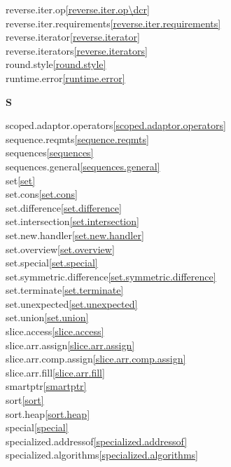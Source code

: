 \begin{multicols}{2}
reverse.iter.op\dcr\quad\ref{reverse.iter.op\dcr}\\
reverse.iter.requirements\quad\ref{reverse.iter.requirements}\\
reverse.iterator\quad\ref{reverse.iterator}\\
reverse.iterators\quad\ref{reverse.iterators}\\
round.style\quad\ref{round.style}\\
runtime.error\quad\ref{runtime.error}\\
\par \textbf{S}\par
scoped.adaptor.operators\quad\ref{scoped.adaptor.operators}\\
sequence.reqmts\quad\ref{sequence.reqmts}\\
sequences\quad\ref{sequences}\\
sequences.general\quad\ref{sequences.general}\\
set\quad\ref{set}\\
set.cons\quad\ref{set.cons}\\
set.difference\quad\ref{set.difference}\\
set.intersection\quad\ref{set.intersection}\\
set.new.handler\quad\ref{set.new.handler}\\
set.overview\quad\ref{set.overview}\\
set.special\quad\ref{set.special}\\
set.symmetric.difference\quad\ref{set.symmetric.difference}\\
set.terminate\quad\ref{set.terminate}\\
set.unexpected\quad\ref{set.unexpected}\\
set.union\quad\ref{set.union}\\
slice.access\quad\ref{slice.access}\\
slice.arr.assign\quad\ref{slice.arr.assign}\\
slice.arr.comp.assign\quad\ref{slice.arr.comp.assign}\\
slice.arr.fill\quad\ref{slice.arr.fill}\\
smartptr\quad\ref{smartptr}\\
sort\quad\ref{sort}\\
sort.heap\quad\ref{sort.heap}\\
special\quad\ref{special}\\
specialized.addressof\quad\ref{specialized.addressof}\\
specialized.algorithms\quad\ref{specialized.algorithms}\\

\end{multicols}
